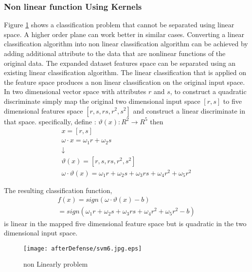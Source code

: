 \subsubsection {Non linear function Using Kernels}
Figure \ref{fig:svm6} shows a classification problem that cannot be separated using linear space. A higher order plane can work better in similar cases. Converting a linear classification algorithm into non linear classification algorithm can be achieved by adding additional attribute to the data that are nonlinear functions of the original data. The expanded dataset features space can be separated using an existing linear classification algorithm.  The linear classification that is applied on the feature space produces a non linear classification on the original input space. In two dimensional vector space with attributes $r$ and $s$, to construct a quadratic  discriminate  simply map the original two dimensional input space $\left[r,s\right]$ to  five dimensional features space $\left[r,s,rs,r^2,s^2\right]$ and construct a linear discriminate in that space. specifically, define : $\vartheta(x):R^2  \rightarrow R^5$ then 
\begin{equation}
\begin{array}{l}
	x=[r,s] \\
	\omega \cdot x=\omega_1 r+ \omega_2 s \\
	\downarrow \\
	\vartheta(x)=\left[r,s,rs,r^2,s^2\right] \\
	
	 \omega \cdot \vartheta(x)= \omega_1 r+ \omega_2 s + \omega_3 rs+ \omega_4 r^2+\omega_5 r^2 
\end{array}
\label{eq:kernel}
\end{equation}  

The resulting classification function, 
\begin{equation}
\begin{array}{l}
f(x)=sign\left( \omega \cdot\vartheta(x)-b \right) \\
= sign\left( \omega_1 r+ \omega_2 s + \omega_3 rs+ \omega_4 r^2+\omega_5 r^2 -b \right) 
\end{array}
\label{eq:kern2}
\end{equation}  
is linear in the mapped five dimensional feature space but is quadratic in the two dimensional input space. 

\begin{figure}
	\centering
		\texttt{[image: afterDefense/svm6.jpg.eps]}
	\caption{non Linearly problem }
	\label{fig:svm6}
\end{figure}




